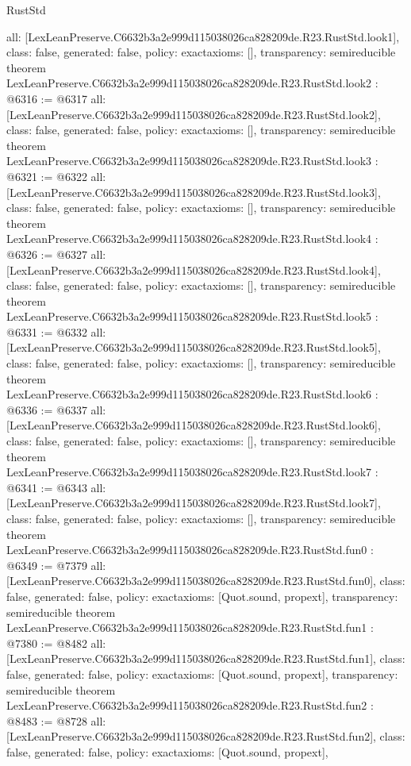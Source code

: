 \begin{lexlean}{RustStd}
\begin{coremodule}
{  all: [LexLeanPreserve.C6632b3a2e999d115038026ca828209de.R23.RustStd.look1],
  class: false,
  generated: false,
  policy: exact{axioms: []},
  transparency: semireducible
}
theorem LexLeanPreserve.C6632b3a2e999d115038026ca828209de.R23.RustStd.look2 : @6316 := @6317 {
  all: [LexLeanPreserve.C6632b3a2e999d115038026ca828209de.R23.RustStd.look2],
  class: false,
  generated: false,
  policy: exact{axioms: []},
  transparency: semireducible
}
theorem LexLeanPreserve.C6632b3a2e999d115038026ca828209de.R23.RustStd.look3 : @6321 := @6322 {
  all: [LexLeanPreserve.C6632b3a2e999d115038026ca828209de.R23.RustStd.look3],
  class: false,
  generated: false,
  policy: exact{axioms: []},
  transparency: semireducible
}
theorem LexLeanPreserve.C6632b3a2e999d115038026ca828209de.R23.RustStd.look4 : @6326 := @6327 {
  all: [LexLeanPreserve.C6632b3a2e999d115038026ca828209de.R23.RustStd.look4],
  class: false,
  generated: false,
  policy: exact{axioms: []},
  transparency: semireducible
}
theorem LexLeanPreserve.C6632b3a2e999d115038026ca828209de.R23.RustStd.look5 : @6331 := @6332 {
  all: [LexLeanPreserve.C6632b3a2e999d115038026ca828209de.R23.RustStd.look5],
  class: false,
  generated: false,
  policy: exact{axioms: []},
  transparency: semireducible
}
theorem LexLeanPreserve.C6632b3a2e999d115038026ca828209de.R23.RustStd.look6 : @6336 := @6337 {
  all: [LexLeanPreserve.C6632b3a2e999d115038026ca828209de.R23.RustStd.look6],
  class: false,
  generated: false,
  policy: exact{axioms: []},
  transparency: semireducible
}
theorem LexLeanPreserve.C6632b3a2e999d115038026ca828209de.R23.RustStd.look7 : @6341 := @6343 {
  all: [LexLeanPreserve.C6632b3a2e999d115038026ca828209de.R23.RustStd.look7],
  class: false,
  generated: false,
  policy: exact{axioms: []},
  transparency: semireducible
}
theorem LexLeanPreserve.C6632b3a2e999d115038026ca828209de.R23.RustStd.fun0 : @6349 := @7379 {
  all: [LexLeanPreserve.C6632b3a2e999d115038026ca828209de.R23.RustStd.fun0],
  class: false,
  generated: false,
  policy: exact{axioms: [Quot.sound, propext]},
  transparency: semireducible
}
theorem LexLeanPreserve.C6632b3a2e999d115038026ca828209de.R23.RustStd.fun1 : @7380 := @8482 {
  all: [LexLeanPreserve.C6632b3a2e999d115038026ca828209de.R23.RustStd.fun1],
  class: false,
  generated: false,
  policy: exact{axioms: [Quot.sound, propext]},
  transparency: semireducible
}
theorem LexLeanPreserve.C6632b3a2e999d115038026ca828209de.R23.RustStd.fun2 : @8483 := @8728 {
  all: [LexLeanPreserve.C6632b3a2e999d115038026ca828209de.R23.RustStd.fun2],
  class: false,
  generated: false,
  policy: exact{axioms: [Quot.sound, propext]},
}
\end{coremodule}
\end{lexlean}
